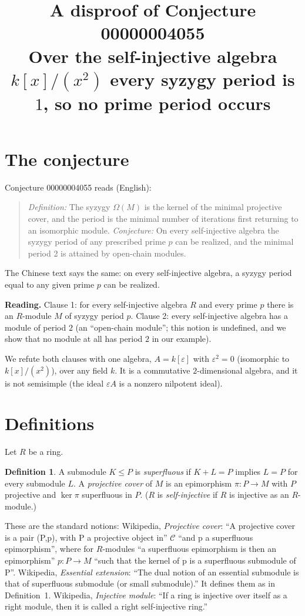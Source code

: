 \documentclass[11pt]{article}
\title{A disproof of Conjecture 00000004055\\[2pt]
\large Over the self-injective algebra $k[x]/(x^2)$ every syzygy period is $1$, so no prime period occurs}
\date{}
\renewcommand{\_}{\oldus\allowbreak}
\theoremstyle{definition}
\newtheorem{definition}[theorem]{Definition}
\theoremstyle{remark}
\begin{document}
\sloppy
\maketitle

\section{The conjecture}

Conjecture 00000004055 reads (English):
\begin{quote}
\emph{Definition:} The syzygy $\Omega(M)$ is the kernel of the minimal projective cover, and the
period is the minimal number of iterations first returning to an isomorphic module.
\emph{Conjecture:} On every self-injective algebra the syzygy period of any prescribed prime $p$
can be realized, and the minimal period 2 is attained by open-chain modules.
\end{quote}
The Chinese text says the same: on every self-injective algebra, a syzygy period equal to any
given prime $p$ can be realized.

\textbf{Reading.} Clause 1: for every self-injective algebra $R$ and every prime $p$ there is an
$R$-module $M$ of syzygy period $p$. Clause 2: every self-injective algebra has a module of
period $2$ (an ``open-chain module''; this notion is undefined, and we show that no module at
all has period $2$ in our example).

We refute both clauses with one algebra, $A=k[\varepsilon]$ with $\varepsilon^2=0$ (isomorphic to
$k[x]/(x^2)$), over any field $k$. It is a commutative $2$-dimensional algebra, and it is not
semisimple (the ideal $\varepsilon A$ is a nonzero nilpotent ideal).

\section{Definitions}

Let $R$ be a ring.
\begin{definition}
A submodule $K\le P$ is \emph{superfluous} if $K+L=P$ implies $L=P$ for every submodule $L$.
A \emph{projective cover} of $M$ is an epimorphism $\pi:P\to M$ with $P$ projective and $\ker\pi$
superfluous in $P$. ($R$ is \emph{self-injective} if $R$ is injective as an $R$-module.)
\end{definition}
These are the standard notions: Wikipedia, \emph{Projective cover}: ``A projective cover is a pair
(P,p), with P a projective object in'' $\mathcal{C}$ ``and p a superfluous epimorphism'', where for
$R$-modules ``a superfluous epimorphism is then an epimorphism'' $p:P\to M$ ``such that the kernel
of p is a superfluous submodule of P''. Wikipedia, \emph{Essential extension}: ``The dual notion of an
essential submodule is that of superfluous submodule (or small submodule).'' It defines them as in
Definition~1. Wikipedia, \emph{Injective
module}: ``If a ring is injective over itself as a right module, then it is called a right
self-injective ring.''
\end{document}
